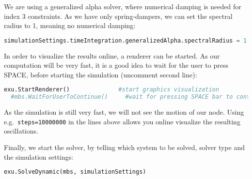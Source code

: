 %
We are using a generalized alpha solver, where numerical damping is needed for index 3 constraints. As we have only spring-dampers, we can set the spectral radius to 1, meaning no numerical damping:
\begin{lstlisting}[language=Python, firstnumber=45]
  simulationSettings.timeIntegration.generalizedAlpha.spectralRadius = 1
\end{lstlisting}
%
In order to visualize the results online, a renderer can be started. As our computation will be very fast, it is a good idea to wait for the user to press SPACE, before starting the simulation (uncomment second line):
\begin{lstlisting}[language=Python, firstnumber=46]
  exu.StartRenderer()              #start graphics visualization
  #mbs.WaitForUserToContinue()     #wait for pressing SPACE bar to continue
\end{lstlisting}
As the simulation is still very fast, we will not see the motion of our node. Using e.g.\ \texttt{steps=10000000} in the lines above allows you online visualize the resulting oscillations.

%
Finally, we start the solver, by telling which system to be solved, solver type and the simulation settings:
\begin{lstlisting}[language=Python, firstnumber=48]
  exu.SolveDynamic(mbs, simulationSettings)
\end{lstlisting}
%

